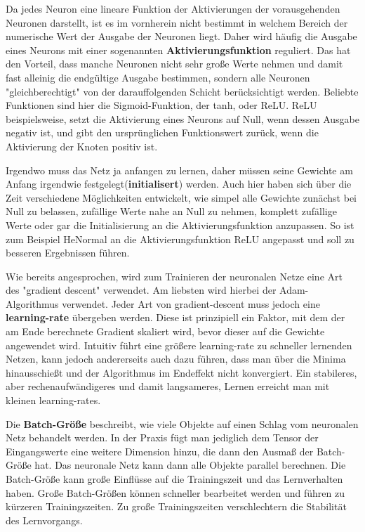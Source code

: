 Da jedes Neuron eine lineare Funktion der Aktivierungen der vorausgehenden Neuronen darstellt, ist es im vornherein nicht bestimmt in welchem Bereich der numerische Wert der Ausgabe der Neuronen liegt. Daher wird häufig die Ausgabe eines Neurons mit einer sogenannten \textbf{Aktivierungsfunktion} reguliert. Das hat den Vorteil, dass manche Neuronen nicht sehr große Werte nehmen und damit fast alleinig die endgültige Ausgabe bestimmen, sondern alle Neuronen "gleichberechtigt" von der darauffolgenden Schicht berücksichtigt werden. Beliebte Funktionen sind hier die Sigmoid-Funktion, der tanh, oder ReLU. ReLU beispielsweise, setzt die Aktivierung eines Neurons auf Null, wenn dessen Ausgabe negativ ist, und gibt den ursprünglichen Funktionswert zurück, wenn die Aktivierung der Knoten positiv ist. 

Irgendwo muss das Netz ja anfangen zu lernen, daher müssen seine Gewichte am Anfang irgendwie festgelegt(\textbf{initialisert}) werden.  Auch hier haben sich über die Zeit verschiedene Möglichkeiten entwickelt, wie simpel alle Gewichte zunächst bei Null zu belassen, zufällige Werte nahe an Null zu nehmen, komplett zufällige Werte oder gar die Initialisierung an die Aktivierungsfunktion anzupassen. So ist zum Beispiel HeNormal an die Aktivierungsfunktion ReLU angepasst und soll zu besseren Ergebnissen führen.

Wie bereits angesprochen, wird zum Trainieren der neuronalen Netze eine Art des "gradient descent" verwendet. Am liebsten wird hierbei der Adam-Algorithmus verwendet. Jeder Art von gradient-descent muss jedoch eine \textbf{learning-rate} übergeben werden. Diese ist prinzipiell ein Faktor, mit dem der am Ende berechnete Gradient skaliert wird, bevor dieser auf die Gewichte angewendet wird. Intuitiv führt eine größere learning-rate zu schneller lernenden Netzen, kann jedoch andererseits auch dazu führen, dass man über die Minima hinausschießt und der Algorithmus im Endeffekt nicht konvergiert. Ein stabileres, aber rechenaufwändigeres und damit langsameres, Lernen erreicht man mit kleinen learning-rates. 

Die \textbf{Batch-Größe} beschreibt, wie viele Objekte auf einen Schlag vom neuronalen Netz behandelt werden. In der Praxis fügt man jediglich dem Tensor der Eingangswerte eine weitere Dimension hinzu, die dann den Ausmaß der Batch-Größe hat. Das neuronale Netz kann dann alle Objekte parallel berechnen. Die Batch-Größe kann große Einflüsse auf die Trainingszeit und das Lernverhalten haben. Große Batch-Größen können schneller bearbeitet werden und führen zu kürzeren Trainingszeiten. Zu große Trainingszeiten verschlechtern die Stabilität des Lernvorgangs.

